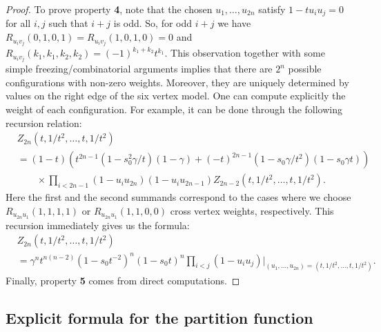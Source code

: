 \documentclass[ALCO,Unicode]{cedram}
\begin{document}
\begin{proof}
	To prove property \textbf{4}, note that the chosen $u_1, \dots, u_{2n}$ satisfy 
	$
	1 - t u_i u_j = 0
	$ for all $i, j$ such that $i+j$  is odd. So, for odd $i+j$ we have $R_{u_i v_j}(0,1,0,1) = R_{u_i v_j}(1,0,1,0) = 0$ and $R_{u_i v_j}(k_1,k_1,k_2,k_2) = (-1)^{k_1 + k_2} t^{k_1}$.
	This observation together with some simple freezing/combinatorial arguments implies that there are $2^{n}$ possible configurations with non-zero weights. Moreover, they are uniquely determined by values on the right edge of the six vertex model. One can compute explicitly the weight of each configuration. For example, it can be done through the following recursion relation:
	\begin{equation*}
	\begin{split}
	&Z_{2n}(t,  1 / t^2, \dots, t,   1 / t^2)
	\\
	&=(1 - t) (t^{2n-1} (1 - s_{0}^2 \gamma/t)(1 - \gamma) + (-t)^{2n-1}(1 - s_0 \gamma/ t^{2})(1 - s_0 \gamma t))  
	\\&\qquad\times\prod_{i<2n-1} (1 - u_i u_{2n}) (1 - u_i u_{2n-1})
	Z_{2n-2} (t,  1 / t^2, \dots, t,   1 / t^2).
	\end{split}
	\end{equation*}
	Here the first and the second summands correspond to the cases where we choose $R_{u_{2n} u_{1}}(1, 1, 1, 1)$ or $R_{u_{2n} u_{1}}(1, 1, 0, 0)$ cross vertex weights, respectively. 
	This recursion immediately gives us the formula:
	\begin{equation*}
	\begin{split}
	&
	Z_{2n}(t,  1 / t^2, \dots, t,   1 / t^2) \\&
	=  \gamma^{n} t^{n(n-2)} (1 - s_{0} t^{-2})^n (1 -s_{0} t)^{n}\prod_{i<j} (1 - u_i u_j)|_{(u_1, ... , u_{2n}) = (t,  1 / t^2, \dots, t,   1 / t^2)}.
	\end{split}
	\end{equation*}
	Finally, property {\bf 5} comes from direct computations.
\end{proof}

\subsection{Explicit formula for the partition function}
\end{document}
